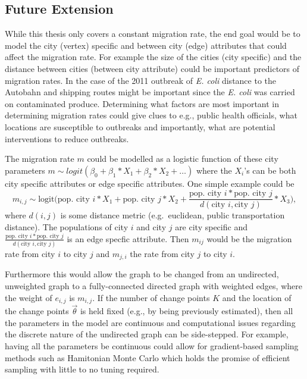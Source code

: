 \documentclass[11pt,a4paper]{article}
\begin{document}
\hypertarget{future-extension}{%
\subsection{Future Extension}\label{future-extension}}

While this thesis only covers a constant migration rate, the end goal
would be to model the city (vertex) specific and between city (edge)
attributes that could affect the migration rate. For example the size of
the cities (city specific) and the distance between cities (between city
attribute) could be important predictors of migration rates. In the case
of the 2011 outbreak of \emph{E. coli} distance to the Autobahn and
shipping routes might be important since the \emph{E. coli} was carried
on contaminated produce. Determining what factors are most important in
determining migration rates could give clues to e.g., public health
officials, what locations are susceptible to outbreaks and importantly,
what are potential interventions to reduce outbreaks.

The migration rate \(m\) could be modelled as a logistic function of
these city parameters
\(m \sim logit(\beta_0 + \beta_1*X_1 + \beta_2*X_2 + \dots)\) where the
\(X_i\)'s can be both city specific attributes or edge specific
attributes. One simple example could be
\[m_{i,j} \sim \text{logit}\big(\text{pop. city }i*X_1 + \text{pop. city } j*X_2 + \frac{\text{pop. city }i*\text{pop. city }j}{d(\text{city }i, \text{city }j)}*X_3\big), \]
where \(d(i,j)\) is some distance metric (e.g.~euclidean, public
transportation distance). The populations of city \(i\) and city \(j\)
are city specific and
\(\frac{\text{pop. city }i*\text{pop. city }j}{d(\text{city }i, \text{city }j)}\)
is an edge specfic attribute. Then \(m_{ij}\) would be the migration
rate from city \(i\) to city \(j\) and \(m_{j,i}\) the rate from city
\(j\) to city \(i\).

Furthermore this would allow the graph to be changed from an undirected,
unweighted graph to a fully-connected directed graph with weighted
edges, where the weight of \(e_{i,j}\) is \(m_{i,j}\). If the number of
change points \(K\) and the location of the change points
\(\vec{\theta}\) is held fixed (e.g., by being previously estimated),
then all the parameters in the model are continuous and computational
issues regarding the discrete nature of the undirected graph can be
side-stepped. For example, having all the parameters be continuous could
allow for gradient-based sampling methods such as Hamitonian Monte Carlo
which holds the promise of efficient sampling with little to no tuning
required.
\end{document}
